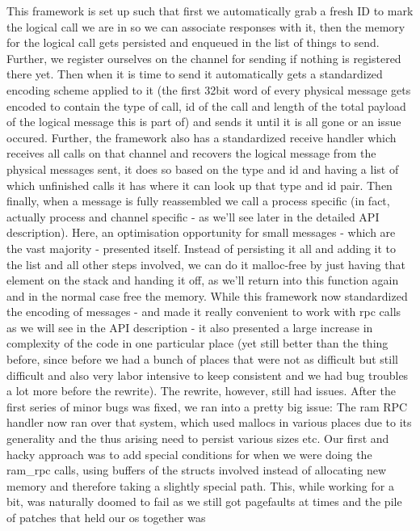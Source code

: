 This framework is set up such that first we automatically grab a fresh ID to 
mark the logical call we are in so we can associate responses with it, then 
the memory for the logical call gets persisted and enqueued in the list of 
things to send. Further, we register ourselves on the channel for sending if 
nothing is registered there yet.  
Then when it is time to send it automatically gets a standardized encoding 
scheme applied to it (the first 32bit word of every physical message gets 
encoded to contain the type of call, id of the call and length of the total 
payload of the logical message this is part of) and sends it until it is all 
gone or an issue occured.
Further, the framework also has a standardized receive handler which receives 
all calls on that channel and recovers the logical message from the physical 
messages sent, it does so based on the type and id and having a list of which 
unfinished calls it has where it can look up that type and id pair. Then 
finally, when a message is fully reassembled we call a process specific (in 
fact, actually process and channel specific - as we'll see later in the 
detailed API description). Here, an optimisation opportunity for small 
messages - which are the vast majority - presented itself. Instead of 
persisting it all and adding it to the list and all other steps involved, we can do it 
malloc-free by just having that element on the stack and handing it off, as 
we'll return into this function again and in the normal case free the memory.
While this framework now standardized the encoding of messages - and made it 
really convenient to work with rpc calls as we will see in the API description 
- it also presented a large increase in complexity of the code in one 
particular place (yet still better than the thing before, since before we had 
a bunch of places that were not as difficult but still difficult and also very 
labor intensive to keep consistent and we had bug troubles a lot more before 
the rewrite).
The rewrite, however, still had issues. After the first series of minor bugs 
was fixed, we ran into a pretty big issue: The ram RPC handler now ran over 
that system, which used mallocs in various places due to its generality and 
the thus arising need to persist various sizes etc.
Our first and hacky approach was to add special 
conditions for when we were doing the ram\_rpc calls, using buffers of the 
structs involved instead of allocating new memory and therefore taking a slightly special path. 
This, while working for a bit, was naturally doomed to fail as we still got 
pagefaults at times and the pile of patches that held our os together was 
